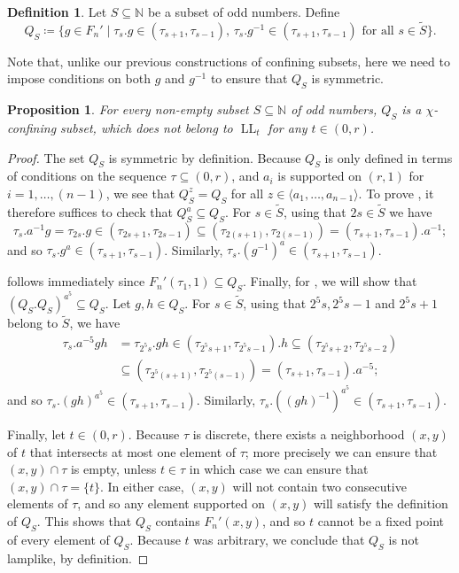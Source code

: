 \documentclass[reqno,12pt]{amsart}\setcounter{tocdepth}{1}
\newtheorem{proposition}[theorem]{Proposition}
\theoremstyle{definition}
\newtheorem{definition}[theorem]{Definition}
\newcommand{\N}{\mathbb{N}}
\DeclareMathOperator{\LL}{LL}
\numberwithin{equation}{section}
\begin{document}
\begin{definition}
\label{def:nonlamplike}
    Let $S \subseteq \N$ be a subset of odd numbers. Define
    \[Q_S \coloneqq \{ g \in F_n' \mid \tau_s.g \in (\tau_{s+1}, \tau_{s-1})\text{, } \tau_s.g^{-1} \in (\tau_{s+1}, \tau_{s-1}) \text{ for all } s \in \widetilde{S} \}.\]
\end{definition}

Note that, unlike our previous constructions of confining subsets, here we need to impose conditions on both $g$ and $g^{-1}$ to ensure that $Q_S$ is symmetric.

\begin{proposition}
\label{prop:nonlamplike}
    For every non-empty subset $S \subseteq \N$ of odd numbers, $Q_S$ is a $\chi$-confining subset, which does not belong to $\LL_t$ for any $t \in (0, r)$.
\end{proposition}

\begin{proof}
    The set $Q_S$ is symmetric by definition. Because $Q_S$ is only defined in terms of conditions on the sequence $\tau \subseteq (0, r)$, and $a_i$ is supported on $(r, 1)$ for $i = 1, \ldots, (n-1)$, we see that $Q_S^z = Q_S$ for all $z \in \langle a_1, \ldots, a_{n-1} \rangle$. To prove \StayInConf, it therefore suffices to check that $Q_S^a \subseteq Q_S$. For $s \in \widetilde{S}$, using that $2s \in \widetilde{S}$ we have
    \[\tau_s.a^{-1}g = \tau_{2s}.g \in (\tau_{2s+1}, \tau_{2s-1}) \subseteq (\tau_{2(s+1)}, \tau_{2(s-1)}) = (\tau_{s+1}, \tau_{s-1}).a^{-1};\]
    and so $\tau_s.g^a \in (\tau_{s+1}, \tau_{s-1})$. Similarly, $\tau_s.(g^{-1})^a \in (\tau_{s+1}, \tau_{s-1})$.

    \GetInConf follows immediately since $F_n'(\tau_1, 1) \subseteq Q_S$. Finally, for \ProdConf, we will show that $(Q_S.Q_S)^{a^{5}} \subseteq Q_S$. Let $g, h \in Q_S$. For $s \in \widetilde{S}$, using that $2^5s, 2^5s-1$ and $2^5s+1$ belong to $\widetilde{S}$, we have
    \begin{align*}
        \tau_s.a^{-{5}}gh &= \tau_{2^5s}.gh \in (\tau_{2^5s+1}, \tau_{2^5s-1}).h \subseteq (\tau_{2^5s+2}, \tau_{2^5s-2}) \\
        &\subseteq (\tau_{2^5(s+1)}, \tau_{2^5(s-1)}) = (\tau_{s+1}, \tau_{s-1}).a^{-{5}};
    \end{align*}
    and so $\tau_s.(gh)^{a^{5}} \in (\tau_{s+1}, \tau_{s-1})$. Similarly, $\tau_s.((gh)^{-1})^{a^{5}} \in (\tau_{s+1}, \tau_{s-1})$.

    Finally, let $t \in (0, r)$. Because $\tau$ is discrete, there exists a neighborhood $(x, y)$ of $t$ that intersects at most one element of $\tau$; more precisely we can ensure that $(x, y) \cap \tau$ is empty, unless $t \in \tau$ in which case we can ensure that $(x, y) \cap \tau = \{ t \}$. In either case, $(x, y)$ will not contain two consecutive elements of $\tau$, and so any element supported on $(x, y)$ will satisfy the definition of $Q_S$. This shows that $Q_S$ contains $F_n'(x, y)$, and so $t$ cannot be a fixed point of every element of $Q_S$. Because $t$ was arbitrary, we conclude that $Q_S$ is not lamplike, by definition.
\end{proof}
\end{document}
